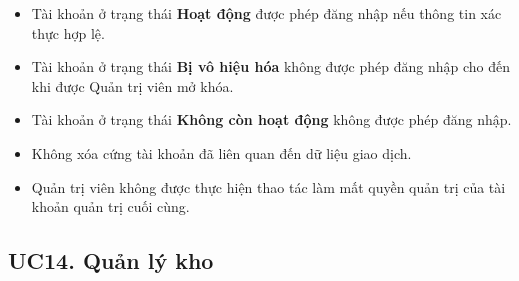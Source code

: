 \documentclass[12pt,a4paper]{article}
\begin{document}
\begin{itemize}
 \begin{itemize}

  \item Tài khoản ở trạng thái \textbf{Hoạt động} được phép đăng nhập nếu thông tin xác thực hợp lệ.

  \item Tài khoản ở trạng thái \textbf{Bị vô hiệu hóa} không được phép đăng nhập cho đến khi được Quản trị viên mở khóa.

  \item Tài khoản ở trạng thái \textbf{Không còn hoạt động} không được phép đăng nhập.

  \item Không xóa cứng tài khoản đã liên quan đến dữ liệu giao dịch.

  \item Quản trị viên không được thực hiện thao tác làm mất quyền quản trị của tài khoản quản trị cuối cùng.

 \end{itemize}

\end{itemize}


\subsection{UC14. Quản lý kho}
\end{document}
